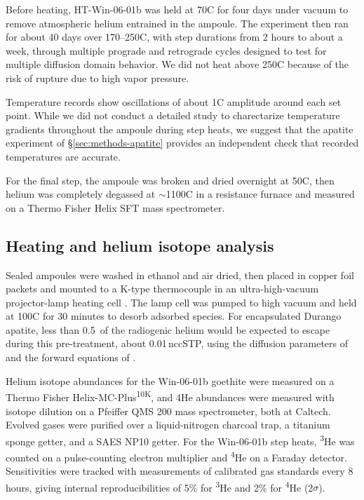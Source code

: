 Before heating, HT-Win-06-01b was held at 70\textdegree C for four days under vacuum to remove atmospheric helium entrained in the ampoule. The experiment then ran for about 40 days over 170--250\textdegree C, with step durations from 2 hours to about a week, through multiple prograde and retrograde cycles designed to test for multiple diffusion domain behavior. We did not heat above 250\textdegree C because of the risk of rupture due to high vapor pressure.

Temperature records show oscillations of about 1\textdegree C amplitude around each set point. While we did not conduct a detailed study to charectarize temperature gradients throughout the ampoule during step heats, we suggest that the apatite experiment of \S\ref{sec:methods-apatite} provides an independent check that recorded temperatures are accurate. 

For the final step, the ampoule was broken and dried overnight at 50\textdegree C, then helium was completely degassed at $\sim$1100\textdegree C in a resistance furnace and measured on a Thermo Fisher Helix SFT mass spectrometer. 

\subsection{Heating and helium isotope analysis}\label{sec:methods-analysis}

Sealed ampoules were washed in ethanol and air dried, then placed in copper foil packets and mounted to a K-type thermocouple in an ultra-high-vacuum projector-lamp heating cell \citep{farley1999}. The lamp cell was pumped to high vacuum and held at 100\textdegree C for 30 minutes to desorb adsorbed species. For encapsulated Durango apatite, less than 0.5\,\textperthousand{} of the radiogenic helium would be expected to escape during this pre-treatment, about 0.01\,nccSTP, using the diffusion parameters of \citet{farley2000} and the forward equations of \citet{fechtigkalbitzer1966}.

Helium isotope abundances for the Win-06-01b goethite were measured on a Thermo Fisher Helix-MC-Plus\textsuperscript{10K}, and 4He abundances were measured with isotope dilution on a Pfeiffer QMS 200 mass spectrometer, both at Caltech. Evolved gases were purified over a liquid-nitrogen charcoal trap, a titanium sponge getter, and a SAES NP10 getter. For the Win-06-01b step heats, \textsuperscript{3}He was counted on a pulse-counting electron multiplier and \textsuperscript{4}He on a Faraday detector. Sensitivities were tracked with measurements of calibrated gas standards every 8 hours, giving internal reproducibilities of 5\% for \textsuperscript{3}He and 2\% for \textsuperscript{4}He (2$\sigma$).

